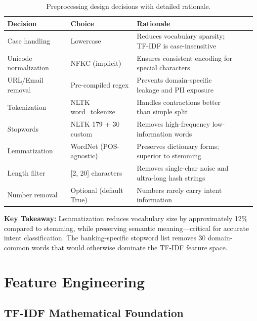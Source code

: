 \documentclass[12pt,a4paper]{article}
\renewcommand{\arraystretch}{1.5}
\newcommand{\goldrowcolors}{%
    \rowcolors{2}{bgCard}{bgDark}%
}
\newcommand{\tableheader}[1]{\textcolor{accentGold}{\textbf{#1}}}
\newcommand{\tablehdrrow}{\rowcolor{accentCard}}
\begin{document}
\begin{table}[H]
\centering
\goldrowcolors
\renewcommand{\arraystretch}{1.4}
\begin{tabularx}{\textwidth}{@{}L{3.5cm} V L{4cm} V X@{}}
\toprule
\tablehdrrow
\tableheader{Decision} & \tableheader{Choice} & \tableheader{Rationale} \\
\midrule
Case handling & Lowercase & Reduces vocabulary sparsity; TF-IDF is case-insensitive \\
Unicode normalization & NFKC (implicit) & Ensures consistent encoding for special characters \\
URL/Email removal & Pre-compiled regex & Prevents domain-specific leakage and PII exposure \\
Tokenization & NLTK word\_tokenize & Handles contractions better than simple split \\
Stopwords & NLTK 179 + 30 custom & Removes high-frequency low-information words \\
Lemmatization & WordNet (POS-agnostic) & Preserves dictionary forms; superior to stemming \\
Length filter & [2, 20] characters & Removes single-char noise and ultra-long hash strings \\
Number removal & Optional (default True) & Numbers rarely carry intent information \\
\bottomrule
\end{tabularx}
\caption{Preprocessing design decisions with detailed rationale.}
\label{tab:preproc-decisions}
\end{table}

\begin{tipbox}
\textbf{Key Takeaway:} Lemmatization reduces vocabulary size by approximately 12\% compared to stemming, while preserving semantic meaning---critical for accurate intent classification. The banking-specific stopword list removes 30 domain-common words that would otherwise dominate the TF-IDF feature space.
\end{tipbox}

\newpage
\section{Feature Engineering}
\label{sec:features}

\subsection{TF-IDF Mathematical Foundation}
\label{subsec:tfidf-math}
\end{document}
